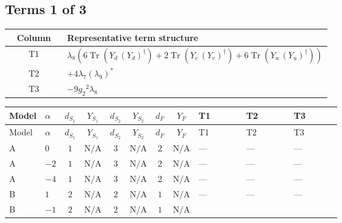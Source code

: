 \documentclass[8pt]{article}
\begin{document}
\begin{landscape}
\subsection*{Terms 1 of 3}
\begin{center}
\begin{tabular}{@{}c >{\raggedright\arraybackslash}p{0.82\linewidth}@{}}
\toprule
Column & Representative term structure \\
\midrule
T1 & \(\displaystyle {\lambda_{8}} (6 \operatorname{Tr}\!\left({Y_d}\,\left({Y_d}\right)^{\dagger}\right)+2 \operatorname{Tr}\!\left({Y_e}\,\left({Y_e}\right)^{\dagger}\right)+6 \operatorname{Tr}\!\left({Y_u}\,\left({Y_u}\right)^{\dagger}\right))\) \\
\midrule
T2 & \(\displaystyle +4 {\lambda_{7}} \left({\lambda_{9}}\right)^{*}\) \\
\midrule
T3 & \(\displaystyle -9 {g_2}^2 {\lambda_{8}}\) \\
\midrule
\bottomrule
\end{tabular}
\end{center}
\smallskip
\tiny
\begin{longtable}{@{}llcccccc >{\raggedright\arraybackslash}p{0.21\linewidth} >{\raggedright\arraybackslash}p{0.21\linewidth} >{\raggedright\arraybackslash}p{0.21\linewidth}@{}}
\toprule
Model & $\alpha$ & $d_{S_1}$ & $Y_{S_1}$ & $d_{S_2}$ & $Y_{S_2}$ & $d_F$ & $Y_F$ & T1 & T2 & T3 \\
\midrule
\endfirsthead
\toprule
Model & $\alpha$ & $d_{S_1}$ & $Y_{S_1}$ & $d_{S_2}$ & $Y_{S_2}$ & $d_F$ & $Y_F$ & T1 & T2 & T3 \\
\midrule
\endhead
A & $0$ & $1$ & $\text{N/A}$ & $3$ & $\text{N/A}$ & $2$ & $\text{N/A}$ & --- & --- & --- \\
\midrule
A & $-2$ & $1$ & $\text{N/A}$ & $3$ & $\text{N/A}$ & $2$ & $\text{N/A}$ & --- & --- & --- \\
\midrule
A & $-4$ & $1$ & $\text{N/A}$ & $3$ & $\text{N/A}$ & $2$ & $\text{N/A}$ & --- & --- & --- \\
\midrule
B & $1$ & $2$ & $\text{N/A}$ & $2$ & $\text{N/A}$ & $1$ & $\text{N/A}$ & --- & --- & --- \\
\midrule
B & $-1$ & $2$ & $\text{N/A}$ & $2$ & $\text{N/A}$ & $1$ & $\text{N/A}$ & \scriptsize\adjustbox{max width=\linewidth}{$\begin{gathered} {\lambda_{8}} (6 \operatorname{Tr}\!\left({Y_d}\,\left({Y_d}\right)^{\dagger}\right)+2 \operatorname{Tr}\!\left({Y_e}\,\left({Y_e}\right)^{\dagger}\right)+6 \operatorname{Tr}\!\left({Y_u}\,\left({Y_u}\right)^{\dagger}\right))\end{gathered}$} & \scriptsize\adjustbox{max width=\linewidth}{$\begin{gathered} +4 {\lambda_{7}} \left({\lambda_{9}}\right)^{*}\end{gathered}$} & \scriptsize\adjustbox{max width=\linewidth}{$\begin{gathered} -9 {g_2}^2 {\lambda_{8}}\end{gathered}$} \\

\end{longtable}
\end{landscape}
\end{document}

